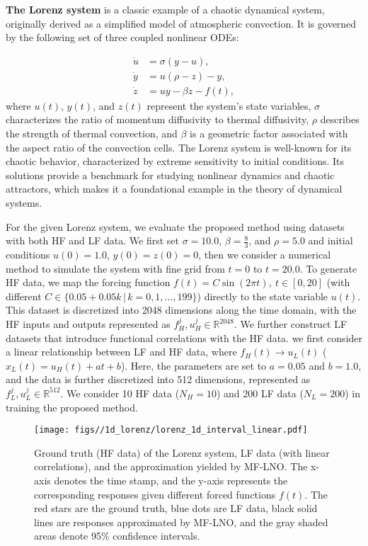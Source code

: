 \textbf{The Lorenz system} is a classic example of a chaotic dynamical system, originally derived as a simplified model of atmospheric convection. It is governed by the following set of three coupled nonlinear ODEs:

\begin{equation}\label{eq:lorenz}
    \begin{aligned}
        \dot{u} &= \sigma (y - u), \\
        \dot{y} &= u (\rho - z) - y, \\
        \dot{z} &= u y - \beta z - f(t),
    \end{aligned}
\end{equation}
where $u(t)$, $y(t)$, and $z(t)$ represent the system’s state variables, $\sigma$ characterizes the ratio of momentum diffusivity to thermal diffusivity, $\rho$ describes the strength of thermal convection, and $\beta$ is a geometric factor associated with the aspect ratio of the convection cells. The Lorenz system is well-known for its chaotic behavior, characterized by extreme sensitivity to initial conditions. Its solutions provide a benchmark for studying nonlinear dynamics and chaotic attractors, which makes it a foundational example in the theory of dynamical systems.

For the given Lorenz system, we evaluate the proposed method using datasets with both HF and LF data. We first set $\sigma=10.0$, $\beta=\frac{8}{3}$, and $\rho=5.0$ and initial conditions $u(0)=1.0$, $y(0)=z(0)=0$, then we consider a numerical method to simulate the system with fine grid from $t=0$ to $t=20.0$. To generate HF data, we map the forcing function $f(t)=C\sin (2\pi t),\ t\in[0, 20]$ (with different $C \in \{0.05 + 0.05k \,|\, k = 0, 1, \dots, 199\}$) directly to the state variable $u(t)$. This dataset is discretized into 2048 dimensions along the time domain, with the HF inputs and outputs represented as $f_H^j, u_H^j \in \mathbb{R}^{2048}$. We further construct LF datasets that introduce functional correlations with the HF data. we first consider a linear relationship between LF and HF data, where $f_H(t) \to u_L(t)$ ($x_L(t) = u_H(t) + a t + b$). Here, the parameters are set to $a = 0.05$ and $b = 1.0$, and the data is further discretized into 512 dimensions, represented as $f_L^j, u_L^j \in \mathbb{R}^{512}$. We consider 10 HF data ($N_H=10$) and 200 LF data ($N_L=200$) in training the proposed method. 

\begin{figure}[!htbp]
    \centering
    \texttt{[image: figs//1d\_lorenz/lorenz\_1d\_interval\_linear.pdf]}
    \caption{Ground truth (HF data) of the Lorenz system, LF data (with linear correlations), and the approximation yielded by MF-LNO. The x-axis denotes the time stamp, and the y-axis represents the corresponding responses given different forced functions $f(t)$. The red stars are the ground truth, blue dots are LF data, black solid lines are responses approximated by MF-LNO, and the gray shaded areas denote 95\% confidence intervals.}
    \label{fig:lorenz_linear}
\end{figure}

